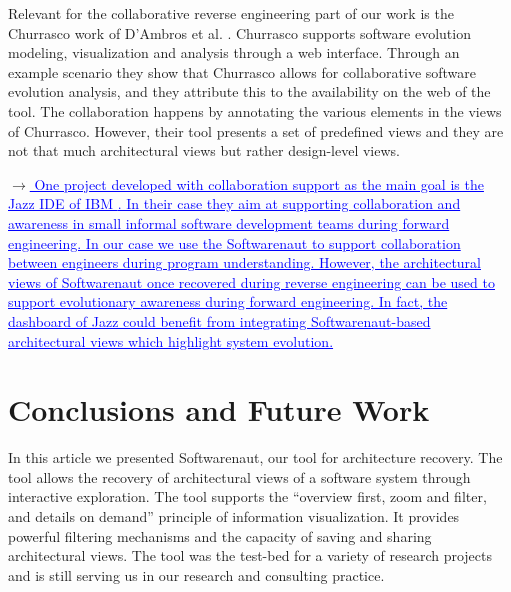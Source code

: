 \documentclass[preprint,12pt]{elsarticle}
\newcommand{\ra}{$\rightarrow$}
\newcommand{\chg}[2]{\textcolor{red}{\sout{#1}}{\ra}\textcolor{blue}{\uline{#2}}} %
\begin{document}
Relevant for the collaborative reverse engineering part of our work is the Churrasco work of D’Ambros et al. \cite{dambros-churrasco}. Churrasco supports software evolution modeling, visualization and analysis through a web interface. 
Through an example scenario they show that Churrasco allows for collaborative software evolution analysis, and they attribute this to the availability on the web of the tool. The collaboration happens by annotating the various elements in the views of Churrasco. However, their tool presents a set of predefined views and they are not that much architectural views but rather design-level views. 

\chg{}{
One project developed with collaboration support as the main goal is the Jazz IDE of IBM \cite{hupfer-jazz}. 
In their case they aim at supporting collaboration and awareness in small informal software development teams during forward engineering. In our case we use the Softwarenaut to support collaboration between engineers during program understanding. However, the architectural views of Softwarenaut once recovered during reverse engineering can be used to support evolutionary awareness during forward engineering. In fact, the dashboard of Jazz could benefit from integrating Softwarenaut-based architectural views which highlight system evolution.
}






\newpage
\section {Conclusions and Future Work}
\label {sec:conc}

In this article we presented Softwarenaut, our tool for architecture recovery. The tool allows the recovery of architectural views of a software system through interactive exploration. The tool supports the ``overview first, zoom and filter, and details on demand'' principle of information visualization. It provides powerful filtering mechanisms and the capacity of saving and sharing architectural views. The tool was the test-bed for a variety of research projects and is still serving us in our research and consulting practice. 
\end{document}
